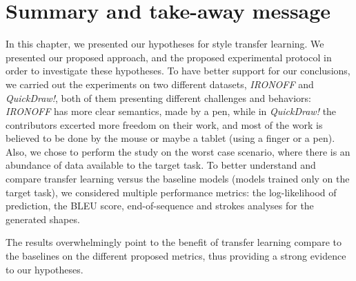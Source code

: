 \section{Summary and take-away message}
\par In this chapter, we presented our hypotheses for style transfer learning. We presented our proposed approach, and the proposed experimental protocol in order to investigate these hypotheses. To have better support for our conclusions, we carried out the experiments on two different datasets, \textit{IRONOFF} and \textit{QuickDraw!}, both of them presenting different challenges and behaviors: \textit{IRONOFF} has more clear semantics, made by a pen, while in \textit{QuickDraw!} the contributors excerted more freedom on their work, and most of the work is believed to be done by the mouse or maybe a tablet (using a finger or a pen). Also, we chose to perform the study on the worst case scenario, where there is an abundance of data available to the target task. To better understand and compare transfer learning versus the baseline models (models trained only on the target task), we considered multiple performance metrics: the log-likelihood of prediction, the BLEU score, end-of-sequence and strokes analyses for the generated shapes.

\par The results overwhelmingly point to the benefit of transfer learning compare to the baselines on the different proposed metrics, thus providing a strong evidence to our hypotheses.

